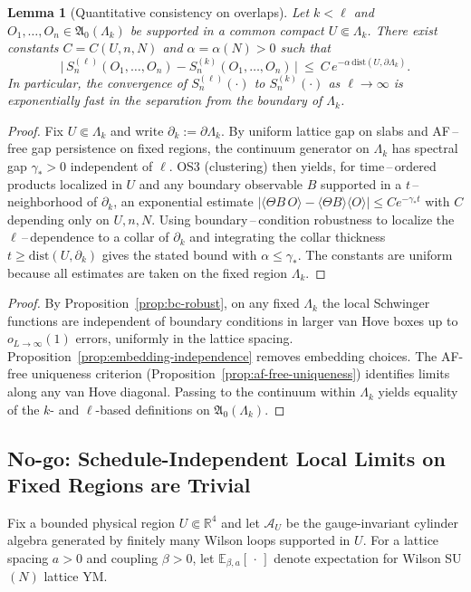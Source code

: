 \documentclass[11pt]{amsart}
\theoremstyle{plain}
\newtheorem{lemma}[theorem]{Lemma}
\theoremstyle{definition}
\theoremstyle{remark}
\begin{document}
\begin{lemma}[Quantitative consistency on overlaps]\label{lem:overlap-quant}
Let $k<\ell$ and $O_1,\dots,O_n\in\mathfrak A_0(\Lambda_k)$ be supported in a common compact $U\Subset \Lambda_k$. There exist constants $C=C(U,n,N)$ and $\alpha=\alpha(N)>0$ such that
\[
  \big|\,S^{(\ell)}_n(O_1,\dots,O_n) - S^{(k)}_n(O_1,\dots,O_n)\,\big|\ \le\ C\, e^{-\alpha\,\mathrm{dist}(U,\partial\Lambda_k)}.
\]
In particular, the convergence of $S^{(\ell)}_n(\cdot)$ to $S^{(k)}_n(\cdot)$ as $\ell\to\infty$ is exponentially fast in the separation from the boundary of $\Lambda_k$.
\end{lemma}
\begin{proof}
Fix $U\Subset\Lambda_k$ and write $\partial_k:=\partial\Lambda_k$. By uniform lattice gap on slabs and AF\,–\,free gap persistence on fixed regions, the continuum generator on $\Lambda_k$ has spectral gap $\gamma_*>0$ independent of $\ell$. OS3 (clustering) then yields, for time\,–\,ordered products localized in $U$ and any boundary observable $B$ supported in a $t$\,–\,neighborhood of $\partial_k$, an exponential estimate $|\langle \Theta B\,O\rangle - \langle\Theta B\rangle\langle O\rangle|\le C e^{-\gamma_* t}$ with $C$ depending only on $U,n,N$. Using boundary\,–\,condition robustness to localize the $\ell$\,–\,dependence to a collar of $\partial_k$ and integrating the collar thickness $t\ge \mathrm{dist}(U,\partial_k)$ gives the stated bound with $\alpha\le \gamma_*$. The constants are uniform because all estimates are taken on the fixed region $\Lambda_k$.
\end{proof}
\begin{proof}
By Proposition~\ref{prop:bc-robust}, on any fixed $\Lambda_k$ the local Schwinger functions are independent of boundary conditions in larger van Hove boxes up to $o_{L\to\infty}(1)$ errors, uniformly in the lattice spacing. Proposition~\ref{prop:embedding-independence} removes embedding choices. The AF-free uniqueness criterion (Proposition~\ref{prop:af-free-uniqueness}) identifies limits along any van Hove diagonal. Passing to the continuum within $\Lambda_k$ yields equality of the $k$- and $\ell$-based definitions on $\mathfrak A_0(\Lambda_k)$.
\end{proof}

\subsection*{No-go: Schedule-Independent Local Limits on Fixed Regions are Trivial}
Fix a bounded physical region $U\Subset\mathbb R^4$ and let $\mathcal A_U$ be the gauge-invariant cylinder algebra generated by finitely many Wilson loops supported in $U$. For a lattice spacing $a>0$ and coupling $\beta>0$, let $\mathbb E_{\beta,a}[\,\cdot\,]$ denote expectation for Wilson SU$(N)$ lattice YM.
\end{document}

